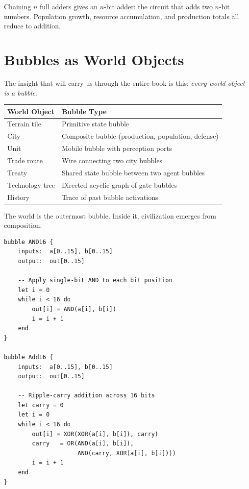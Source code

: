 \documentclass[11pt,a4paper,openany]{book}
\theoremstyle{plain}
\theoremstyle{definition}
\theoremstyle{remark}
\newenvironment{implementation}{%
  \begin{mdframed}[
    linecolor=sphereamber!80, backgroundcolor=sphereamber!5,
    linewidth=1pt, innertopmargin=8pt, innerbottommargin=8pt,
    innerleftmargin=10pt, innerrightmargin=10pt,
    skipabove=10pt, skipbelow=6pt
  ]%
  \setlength{\parindent}{0pt}%
  \noindent{\textcolor{sphereamber!80!black}{\textbf{Implementation}}}\par\smallskip\ignorespaces
}{\end{mdframed}}
\newcommand{\Spbox}{\textsc{Spherepop}\xspace}
\newcommand{\Spbox}{\textbf{Spherepop}\xspace}
\begin{document}
Chaining $n$ full adders gives an $n$-bit adder: the circuit that adds
two $n$-bit numbers. Population growth, resource accumulation, and
production totals all reduce to addition.

\section{Bubbles as World Objects}

The insight that will carry us through the entire book is this:
\emph{every world object is a bubble}.

\begin{center}
\begin{tabular}{ll}
  \toprule
  \textbf{World Object} & \textbf{Bubble Type} \\
  \midrule
  Terrain tile          & Primitive state bubble \\
  City                  & Composite bubble (production, population, defense) \\
  Unit                  & Mobile bubble with perception ports \\
  Trade route           & Wire connecting two city bubbles \\
  Treaty                & Shared state bubble between two agent bubbles \\
  Technology tree       & Directed acyclic graph of gate bubbles \\
  History               & Trace of past bubble activations \\
  \bottomrule
\end{tabular}
\end{center}

The world is the outermost bubble. Inside it, civilization emerges from
composition.

\begin{implementation}
\begin{lstlisting}[caption={Multi-bit AND in \Spbox }]
bubble AND16 {
    inputs:  a[0..15], b[0..15]
    output:  out[0..15]

    -- Apply single-bit AND to each bit position
    let i = 0
    while i < 16 do
        out[i] = AND(a[i], b[i])
        i = i + 1
    end
}

bubble Add16 {
    inputs:  a[0..15], b[0..15]
    output:  out[0..15]

    -- Ripple-carry addition across 16 bits
    let carry = 0
    let i = 0
    while i < 16 do
        out[i] = XOR(XOR(a[i], b[i]), carry)
        carry   = OR(AND(a[i], b[i]),
                     AND(carry, XOR(a[i], b[i])))
        i = i + 1
    end
}
\end{lstlisting}
\end{implementation}
\end{document}
